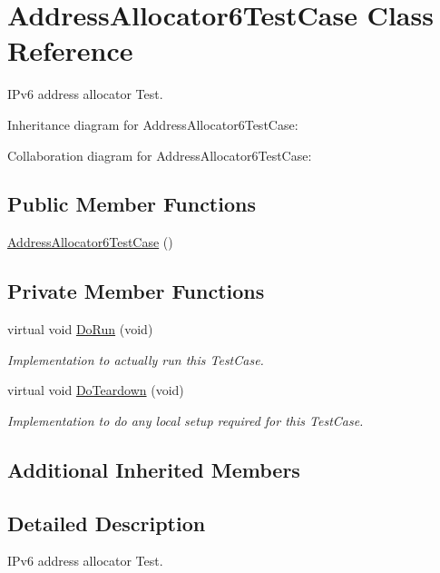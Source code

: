 \hypertarget{classAddressAllocator6TestCase}{}\section{Address\+Allocator6\+Test\+Case Class Reference}
\label{classAddressAllocator6TestCase}


I\+Pv6 address allocator Test.  




Inheritance diagram for Address\+Allocator6\+Test\+Case\+:


Collaboration diagram for Address\+Allocator6\+Test\+Case\+:
\subsection*{Public Member Functions}
\begin{DoxyCompactItemize}
\item 
\hyperlink{classAddressAllocator6TestCase_a585e8c7d56bb54de26a30c4e94d7fdeb}{Address\+Allocator6\+Test\+Case} ()
\end{DoxyCompactItemize}
\subsection*{Private Member Functions}
\begin{DoxyCompactItemize}
\item 
virtual void \hyperlink{classAddressAllocator6TestCase_a6011adcf3bcf07b43ed60ae253a83345}{Do\+Run} (void)
\begin{DoxyCompactList}\small\item\em Implementation to actually run this Test\+Case. \end{DoxyCompactList}\item 
virtual void \hyperlink{classAddressAllocator6TestCase_a793c68d6b71b136720a9449eb1be3356}{Do\+Teardown} (void)
\begin{DoxyCompactList}\small\item\em Implementation to do any local setup required for this Test\+Case. \end{DoxyCompactList}\end{DoxyCompactItemize}
\subsection*{Additional Inherited Members}


\subsection{Detailed Description}
I\+Pv6 address allocator Test. 

